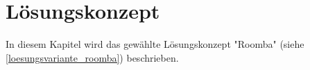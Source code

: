 \documentclass[../main.tex]{subfiles}
\begin{document}
\newpage
\section{Lösungskonzept}

In diesem Kapitel wird das gewählte Lösungskonzept "Roomba" (siehe \ref{loesungsvariante_roomba}) beschrieben. 
\end{document}
